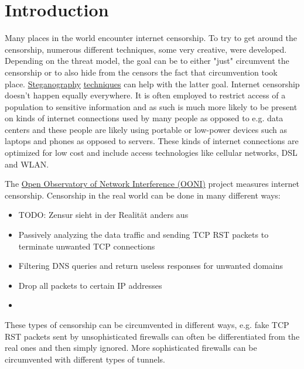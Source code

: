 
\chapter{Introduction}


Many places in the world encounter internet censorship.
To try to get around the censorship, numerous different techniques, some very creative, were developed.
Depending on the threat model, the goal can be to either "just" circumvent the censorship or to also hide from the censors the fact that circumvention took place.
\href{https://en.wikipedia.org/wiki/Steganography}{Steganography} \href{https://en.wikipedia.org/wiki/List_of_steganography_techniques}{techniques} can help with the latter goal.
Internet censorship doesn't happen equally everywhere.
It is often employed to restrict access of a population to sensitive information and as such is much more likely to be present on kinds of internet connections used by many people as opposed to e.g. data centers and these people are likely using portable or low-power devices such as laptops and phones as opposed to servers.
These kinds of internet connections are optimized for low cost and include access technologies like cellular networks, DSL and WLAN.

The \href{https://ooni.org/about/}{Open Observatory of Network Interference (OONI)} project measures internet censorship.
Censorship in the real world can be done in many different ways:
\begin{itemize}
  \item TODO: Zensur sieht in der Realität anders aus
  \item Passively analyzing the data traffic and sending TCP RST packets to terminate unwanted TCP connections
  \item Filtering DNS queries and return useless responses for unwanted domains
  \item Drop all packets to certain IP addresses
  \item {}
\end{itemize}
These types of censorship can be circumvented in different ways, e.g. fake TCP RST packets sent by unsophisticated firewalls can often be differentiated from the real ones and then simply ignored. More sophisticated firewalls can be circumvented with different types of tunnels.

